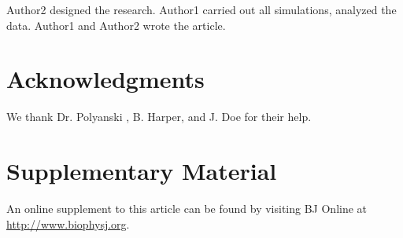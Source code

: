 \documentclass{biophys-new}
\begin{document}
Author2 designed the research. Author1 carried out all simulations, analyzed the data. Author1 and Author2 wrote the article.

\section*{Acknowledgments}

We thank Dr. Polyanski , B. Harper, and J. Doe for their help.




\section*{Supplementary Material}

An online supplement to this article can be found by visiting BJ Online at \url{http://www.biophysj.org}.

\end{document}
